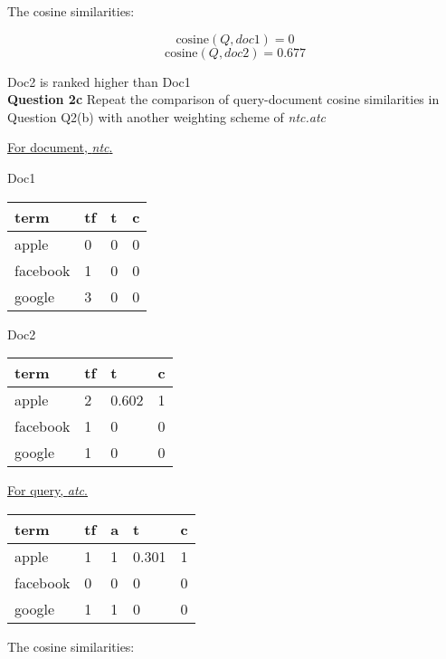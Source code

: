 \documentclass[11pt,a4paper]{report}
\begin{document}
\begin{multicols*}{2}
\noindent The cosine similarities:

$$\text{cosine}(Q, doc1) = 0$$
$$\text{cosine}(Q, doc2) = 0.677$$

\noindent Doc2 is ranked higher than Doc1\\

\noindent \textbf{Question 2c} Repeat the comparison of query-document cosine similarities in Question Q2(b) with another weighting scheme of \textit{ntc.atc}

\noindent \underline{For document, \textit{ntc}.}

\noindent Doc1

\begin{center}
\begin{tabular}{|l | l | l | l|}
    \hline
    term     & tf & t & c \\
    \hline
    apple    & 0 & 0 & 0 \\
    facebook & 1 & 0 & 0 \\
    google   & 3 & 0 & 0 \\
    \hline
\end{tabular}
\end{center}

\noindent Doc2

\begin{center}
\begin{tabular}{|l | l | l | l|}
    \hline
    term     & tf & t & c \\
    \hline
    apple    & 2 & 0.602 & 1 \\
    facebook & 1 & 0 & 0\\
    google   & 1 & 0 & 0\\
    \hline
\end{tabular}
\end{center}

\noindent \underline{For query, \textit{atc}.}

\begin{center}
\begin{tabular}{|l | l | l | l | l |}
    \hline
    term     & tf & a & t & c \\
    \hline
    apple    & 1  & 1 & 0.301 & 1\\
    facebook & 0  & 0 & 0 & 0\\
    google   & 1  & 1 & 0 & 0 \\
    \hline
\end{tabular}
\end{center}

\noindent The cosine similarities:


\end{multicols*}
\end{document}

